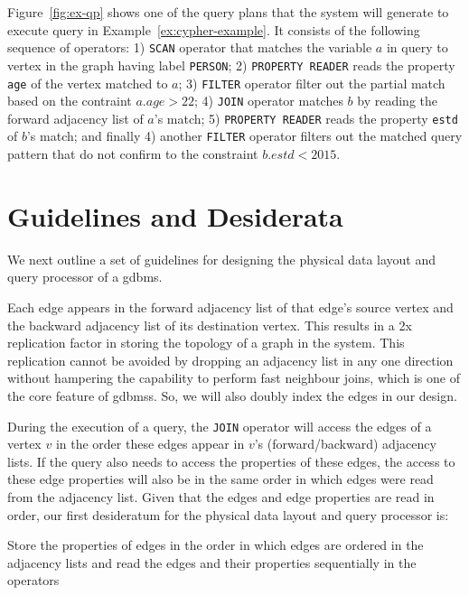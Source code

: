 Figure~\ref{fig:ex-qp} shows one of the query plans that the system will generate to execute query in Example~\ref{ex:cypher-example}. It consists of the following sequence of operators: 1) \texttt{SCAN} operator that matches the variable $a$ in query to vertex in the graph having label \texttt{PERSON}; 2) \texttt{PROPERTY READER} reads the property \texttt{age} of the vertex matched to $a$; 3) \texttt{FILTER} operator filter out the partial match based on the contraint $a.age>22$; 4) \texttt{JOIN} operator matches $b$ by reading the forward adjacency list of $a$'s match; 5) \texttt{PROPERTY READER} reads the property \texttt{estd} of $b$'s match; and finally 4) another \texttt{FILTER} operator filters out the matched query pattern that do not confirm to the constraint $b.estd < 2015$.

\section{Guidelines and Desiderata}
\label{sec:guidelines}

We next outline a set of guidelines for designing the physical data layout and query processor of a \gls{gdbms}.

\begin{guideline}
	\vspace{-5pt}
	Each edge appears in the forward adjacency list of that edge's source vertex and the backward adjacency list of its destination vertex. This results in a 2x replication factor in storing the topology of a graph in the system. This replication cannot be avoided by dropping an adjacency list in any one direction without hampering the capability to perform fast neighbour joins, which is one of the core feature of \gls{gdbms}s. So, we will also doubly index the edges in our design.
\end{guideline}

\label{ssec:edges-ordered}
\begin{guideline}
	During the execution of a query, the \texttt{JOIN} operator will access the edges of a vertex $v$ in the order these edges appear in $v$'s (forward/backward) adjacency lists. If the query also needs to access the properties of these edges, the access to these edge properties will also be in the same order in which edges were read from the adjacency list. Given that the edges and edge properties are read in order, our first desideratum for the physical data layout and query processor is:
	
	\begin{desideratum}
		Store the properties of edges in the order in which edges are ordered in the adjacency lists and read the edges and their properties sequentially in the operators
	\end{desideratum}
	
\end{guideline}

